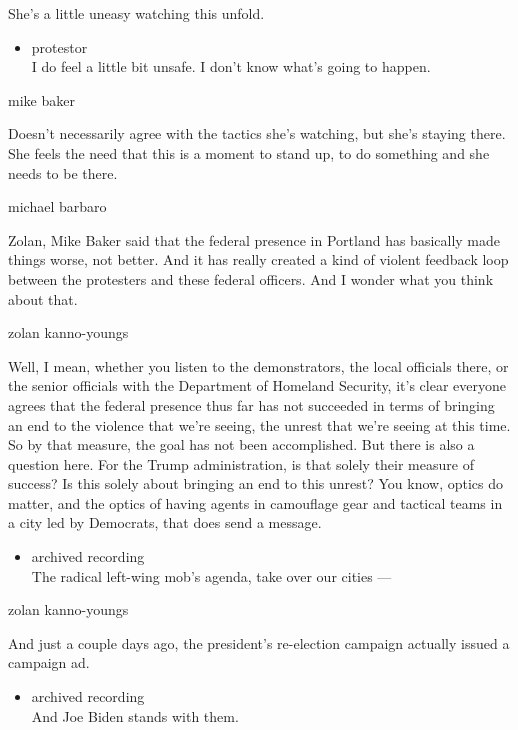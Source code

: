 She's a little uneasy watching this unfold.

\begin{itemize}
\tightlist
\item
  protestor\\
  I do feel a little bit unsafe. I don't know what's going to happen.
\end{itemize}

mike baker

Doesn't necessarily agree with the tactics she's watching, but she's
staying there. She feels the need that this is a moment to stand up, to
do something and she needs to be there.

michael barbaro

Zolan, Mike Baker said that the federal presence in Portland has
basically made things worse, not better. And it has really created a
kind of violent feedback loop between the protesters and these federal
officers. And I wonder what you think about that.

zolan kanno-youngs

Well, I mean, whether you listen to the demonstrators, the local
officials there, or the senior officials with the Department of Homeland
Security, it's clear everyone agrees that the federal presence thus far
has not succeeded in terms of bringing an end to the violence that we're
seeing, the unrest that we're seeing at this time. So by that measure,
the goal has not been accomplished. But there is also a question here.
For the Trump administration, is that solely their measure of success?
Is this solely about bringing an end to this unrest? You know, optics do
matter, and the optics of having agents in camouflage gear and tactical
teams in a city led by Democrats, that does send a message.

\begin{itemize}
\tightlist
\item
  archived recording\\
  The radical left-wing mob's agenda, take over our cities ---
\end{itemize}

zolan kanno-youngs

And just a couple days ago, the president's re-election campaign
actually issued a campaign ad.

\begin{itemize}
\tightlist
\item
  archived recording\\
  And Joe Biden stands with them.
\end{itemize}

